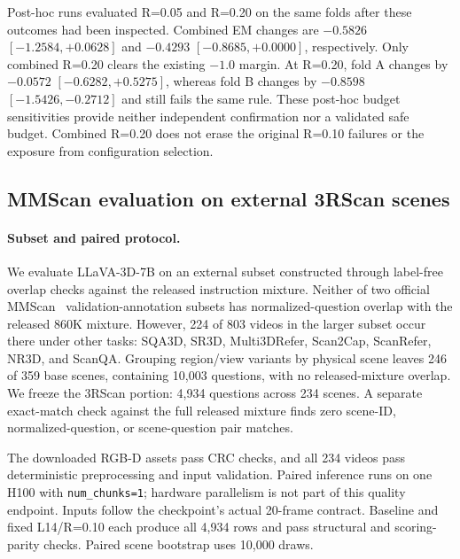 Post-hoc runs evaluated R=0.05 and R=0.20 on the same folds after these outcomes had been inspected. Combined EM changes are $-0.5826$ $[-1.2584,+0.0628]$ and $-0.4293$ $[-0.8685,+0.0000]$, respectively. Only combined R=0.20 clears the existing $-1.0$ margin. At R=0.20, fold A changes by $-0.0572$ $[-0.6282,+0.5275]$, whereas fold B changes by $-0.8598$ $[-1.5426,-0.2712]$ and still fails the same rule. These post-hoc budget sensitivities provide neither independent confirmation nor a validated safe budget. Combined R=0.20 does not erase the original R=0.10 failures or the exposure from configuration selection.

\subsection{MMScan evaluation on external 3RScan scenes}
\label{sec:supp_mmscan}
\paragraph{Subset and paired protocol.} We evaluate LLaVA-3D-7B on an external subset constructed through label-free overlap checks against the released instruction mixture. Neither of two official MMScan~\cite{lyu2024mmscan} validation-annotation subsets has normalized-question overlap with the released 860K mixture. However, 224 of 803 videos in the larger subset occur there under other tasks: SQA3D, SR3D, Multi3DRefer, Scan2Cap, ScanRefer, NR3D, and ScanQA. Grouping region/view variants by physical scene leaves 246 of 359 base scenes, containing 10,003 questions, with no released-mixture overlap. We freeze the 3RScan portion: 4,934 questions across 234 scenes. A separate exact-match check against the full released mixture finds zero scene-ID, normalized-question, or scene-question pair matches.

The downloaded RGB-D assets pass CRC checks, and all 234 videos pass deterministic preprocessing and input validation. Paired inference runs on one H100 with \texttt{num\_chunks=1}; hardware parallelism is not part of this quality endpoint. Inputs follow the checkpoint's actual 20-frame contract. Baseline and fixed L14/R=0.10 each produce all 4,934 rows and pass structural and scoring-parity checks. Paired scene bootstrap uses 10,000 draws.

